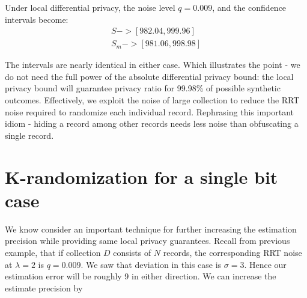 \documentclass[11pt,draft]{article}
\begin{document}
Under local differential privacy, the noise level $q= 0.009$, and the confidence intervals become:
\begin{align}
S -> [982.04 , 999.96] \\
S_m -> [981.06 , 998.98]
\end{align}

The intervals are nearly identical in either case.  Which illustrates the point - we do not need the full power of the absolute differential privacy bound: the local privacy bound will guarantee privacy ratio for 99.98\% of possible synthetic outcomes.  Effectively, we exploit the noise of large collection to reduce the RRT noise required to randomize each individual record.  Rephrasing this important idiom - hiding a record among other records needs less noise than obfuscating a single record.


\section{K-randomization for a single bit case}

We know consider an important technique for further increasing the estimation precision while providing same local privacy guarantees.  Recall from previous example, that if collection $D$ consists of $N$ records, the corresponding RRT noise at $\lambda = 2$ is $q=0.009$.  We saw that deviation in this case is $\sigma=3$.  Hence our estimation error will be roughly 9 in either direction.   We can increase the estimate precision by  
\end{document}
